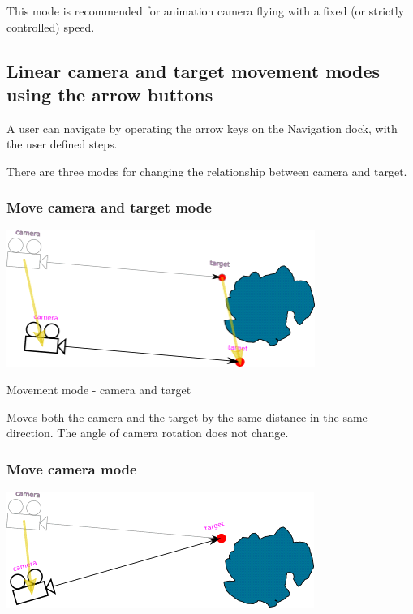 This mode is recommended for animation camera flying with a fixed (or strictly
controlled) speed.

\subsection{Linear camera and target movement modes using the arrow
	buttons}\label{linear-camera-and-target-movement-modes-using-the-arrow-buttons}

A user can navigate by operating the arrow keys on the Navigation dock, with the
user defined steps.

There are three modes for changing the relationship between camera and target.

\subsubsection{Move camera and target mode}\label{move-camera-and-target-mode}

\includegraphics[width=3.95347in,height=1.75556in]{img/manual/media/image11.png}

Movement mode - camera and target

Moves both the camera and the target by the same distance in the same direction.
The angle of camera rotation does not change.

\subsubsection{Move camera mode}\label{move-camera-mode}

\includegraphics[width=3.95347in,height=1.48819in]{img/manual/media/image12.png}

